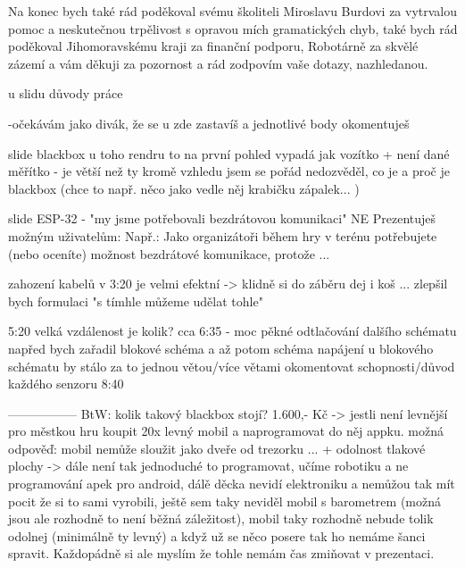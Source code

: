 Na konec bych také rád poděkoval svému školiteli Miroslavu Burdovi za vytrvalou pomoc a neskutečnou trpělivost s opravou mích gramatických chyb, 
také bych rád poděkoval Jihomoravskému kraji za finanční podporu, Robotárně za skvělé zázemí 
a vám děkuji za pozornost a rád zodpovím vaše dotazy, nazhledanou.


u slidu důvody práce 

-očekávám jako divák, že se u zde zastavíš a jednotlivé body okomentuješ 


slide blackbox 
u toho rendru to na první pohled vypadá jak vozítko + není dané měřítko - je větší než ty 
kromě vzhledu jsem se pořád nedozvěděl, co je a proč je blackbox 
(chce to např. něco jako vedle něj krabičku zápalek... ) 


slide ESP-32 - "my jsme potřebovali bezdrátovou komunikaci" 
NE 
Prezentuješ možným uživatelům: 
Např.: Jako organizátoři během hry v terénu potřebujete (nebo oceníte) 
možnost bezdrátové komunikace, protože ... 


zahození kabelů v 3:20 je velmi efektní -> klidně si do záběru dej i koš ... 
zlepšil bych formulaci "s tímhle můžeme udělat tohle" %

5:20 velká vzdálenost je kolik? %
cca 6:35 - moc pěkné odtlačování dalšího schématu 
napřed bych zařadil blokové schéma a až potom schéma napájení 
u blokového schématu by stálo za to jednou větou/více větami okomentovat schopnosti/důvod každého senzoru 
8:40  

-----------------
BtW: kolik takový blackbox stojí? 1.600,- Kč -> jestli není levnější 
pro městkou hru koupit 20x levný mobil a naprogramovat do něj appku.    
možná odpověď: mobil nemůže sloužit jako dveře od trezorku ...  + odolnost tlakové plochy -> dále není tak jednoduché to programovat, učíme robotiku a ne programování apek pro android, dálě děcka nevidí elektroniku a nemůžou tak mít pocit že si to sami vyrobili, ještě sem taky neviděl mobil s barometrem (možná jsou ale rozhodně to není běžná záležitost), mobil taky rozhodně nebude tolik odolnej (minimálně ty levný) a když už se něco posere tak ho nemáme šanci spravit. Každopádně si ale myslím že tohle nemám čas zmiňovat v prezentaci.